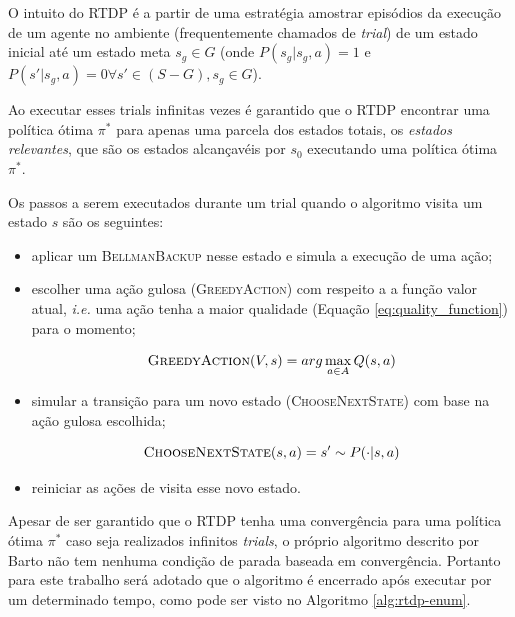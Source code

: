 \documentclass[letterpaper]{article}
\begin{document}
O intuito do RTDP é a partir de uma estratégia amostrar episódios da execução de um agente no ambiente (frequentemente chamados de \emph{trial}) de um estado inicial até um estado meta $s_g \in G$ (onde $P(s_g|s_g,a) = 1$ e $P(s'|s_g,a) = 0 \forall s' \in (S - G), s_g \in G$).

Ao executar esses trials infinitas vezes é garantido que o RTDP encontrar uma política ótima $\pi^*$ para apenas uma parcela dos estados totais, os \emph{estados relevantes}, que são os estados alcançavéis por $s_0$ executando uma política ótima $\pi^*$.

Os passos a serem executados durante um trial quando o algoritmo visita um estado $s$ são os seguintes:

\begin{itemize}
    \item aplicar um \textsc{BellmanBackup} nesse estado e simula a execução de uma ação;
    \item escolher uma ação gulosa (\textsc{GreedyAction}) com respeito a a função valor atual, \textit{i.e.} uma ação tenha a maior qualidade (Equação \ref{eq:quality_function}) para o momento;

    \begin{equation} \label{eq:greedy_action}
        \textsc{GreedyAction}(V, s) = arg \max_{a \in A} Q(s,a)
    \end{equation}

    \item simular a transição para um novo estado (\textsc{ChooseNextState}) com base na ação gulosa escolhida;

    \begin{equation} \label{eq:bellman_backup}
        \textsc{ChooseNextState}(s, a) = s' \sim P(\cdot|s,a)
    \end{equation}

    \item reiniciar as ações de visita esse novo estado.
\end{itemize}

Apesar de ser garantido que o RTDP tenha uma convergência para uma política ótima $\pi^*$ caso seja realizados infinitos \emph{trials}, o próprio algoritmo descrito por Barto não tem nenhuma condição de parada baseada em convergência. Portanto para este trabalho será adotado que o algoritmo é encerrado após executar por um determinado tempo, como pode ser visto no Algoritmo \ref{alg:rtdp-enum}.
\end{document}
